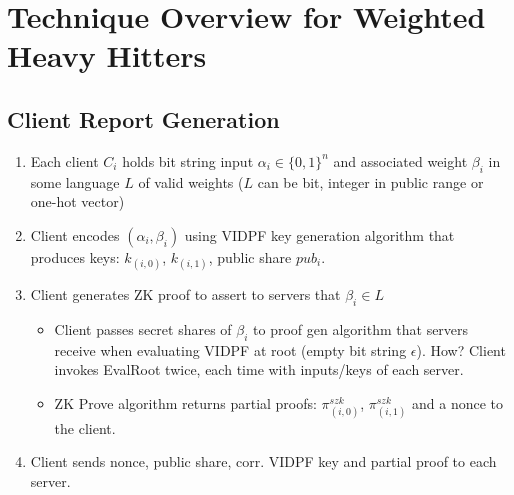 \section{Technique Overview for Weighted Heavy Hitters}
\subsection{Client Report Generation}
\begin{enumerate}
    \item Each client $C_i$ holds bit string input $\alpha_i \in \{0, 1\}^n$ and associated weight $\beta_i$ in some language $L$ of valid weights ($L$ can be bit, integer in public range or one-hot vector)
    \item Client encodes $(\alpha_i, \beta_i)$ using VIDPF key generation algorithm that produces keys: $k_{(i, 0)}$, $k_{(i, 1)}$, public share $pub_i$.
    \item Client generates ZK proof to assert to servers that $\beta_i \in L$
    \begin{itemize}
        \item Client passes secret shares of $\beta_i$ to proof gen algorithm that servers receive when evaluating VIDPF at root (empty bit string $\epsilon$). How? Client invokes EvalRoot twice, each time with inputs/keys of each server.
        \item ZK Prove algorithm returns partial proofs: $\pi_{(i, 0)}^{szk}$, $\pi_{(i, 1)}^{szk}$ and a nonce to the client.

    \end{itemize}
    \item Client sends nonce, public share, corr. VIDPF key and partial proof to each server.
\end{enumerate}


